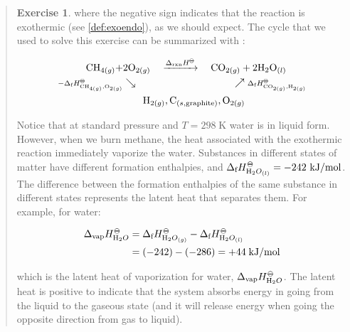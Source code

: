 \documentclass[
  9pt,
]{extbook}
\theoremstyle{definition}
\theoremstyle{definition}
\theoremstyle{definition}
\newtheorem{exercise}{Exercise}[chapter]
\theoremstyle{definition}
\theoremstyle{remark}
\begin{document}
\begin{quote}
\begin{exercise}
where the negative sign indicates that the reaction is exothermic (see \ref{def:exoendo}), as we should expect. The cycle that we used to solve this exercise can be summarized with :

\begin{equation}
\begin{aligned}
\mathrm{CH}_{4(g)} + & 2 \mathrm{O}_{2(g)} \quad \xrightarrow{\Delta_{\text{rxn}} H^{-\kern-6pt{\ominus}\kern-6pt-}} \quad \mathrm{CO}_{2(g)} + 2 \mathrm{H}_2 \mathrm{O}_{(l)} \\
  \scriptstyle{-\Delta_{\text{f}} H_{\mathrm{CH}_{4(g)},\mathrm{O}_{2(g)}}^{-\kern-6pt{\ominus}\kern-6pt-}} & \searrow \qquad \qquad \qquad \qquad \qquad \nearrow \; \scriptstyle{\Delta_{\text{f}} H_{\text{CO}_{2(g)},\mathrm{H}_{2(g)}}^{-\kern-6pt{\ominus}\kern-6pt-}}\\
  & \qquad \mathrm{H}_{2(g)}, \mathrm{C}_{(s,\text{graphite})}, \mathrm{O}_{2(g)}
\end{aligned}
\end{equation}

Notice that at standard pressure and \(T = 298 \; \mathrm{K}\) water is in liquid form. However, when we burn methane, the heat associated with the exothermic reaction immediately vaporize the water. Substances in different states of matter have different formation enthalpies, and \(\Delta_{\text{f}} H^{-\kern-6pt{\ominus}\kern-6pt-}_{\mathrm{H}_{2}O_{(l)}} =  -242 \  \mathrm{kJ/mol}\). The difference between the formation enthalpies of the same substance in different states represents the latent heat that separates them. For example, for water:

\begin{equation}
\begin{aligned}
\Delta_{\text{vap}} H^{-\kern-6pt{\ominus}\kern-6pt-}_{\mathrm{H}_2O} & = \Delta_{\text{f}} H^{-\kern-6pt{\ominus}\kern-6pt-}_{\mathrm{H}_{2}O_{(g)}} - \Delta_{\text{f}} H^{-\kern-6pt{\ominus}\kern-6pt-}_{\mathrm{H}_{2}O_{(l)}} \\
& = (-242) - (-286) = + 44 \; \text{kJ/mol}
\end{aligned}
\end{equation}

which is the latent heat of vaporization for water, \(\Delta_{\text{vap}} H^{-\kern-6pt{\ominus}\kern-6pt-}_{\mathrm{H}_2O}\). The latent heat is positive to indicate that the system absorbs energy in going from the liquid to the gaseous state (and it will release energy when going the opposite direction from gas to liquid).
\end{exercise}
\end{quote}
\end{document}
